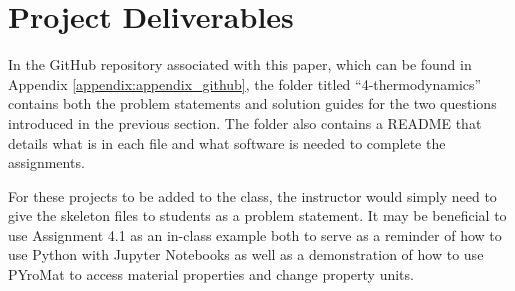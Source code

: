 \section{Project Deliverables}

In the GitHub repository associated with this paper, which can be found in Appendix \ref{appendix:appendix_github},
the folder titled ``4-thermodynamics'' contains both the problem statements and solution guides for the two questions
introduced in the previous section. The folder also contains a README that details what is in each file and 
what software is needed to complete the assignments. 

For these projects to be added to the class, the instructor would simply need to give the skeleton files to 
students as a problem statement. It may be beneficial to use Assignment 4.1 as an in-class example both to serve 
as a reminder of how to use Python with Jupyter Notebooks as well as a demonstration of how to use PYroMat to 
access material properties and change property units.
